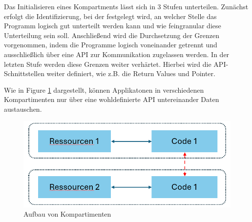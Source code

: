 Das Initialisieren eines Kompartments lässt sich in 3 Stufen unterteilen. Zunächst erfolgt die Identifizierung, bei der festgelegt wird, an welcher Stelle das Programm logisch gut unterteilt werden kann und wie feingranular diese Unterteilung sein soll.
Anschließend wird die Durchsetzung der Grenzen vorgenommen, indem die Programme logisch voneinander getrennt und ausschließlich über eine API zur Kommunikation zugelassen werden. 
In der letzten Stufe werden diese Grenzen weiter verhärtet. Hierbei wird die API-Schnittstellen weiter definiert, wie z.B. die Return Values und Pointer.

Wie in Figure \ref{fig:Kompartment} dargestellt, können Applikatonen in verschiedenen Kompartimenten nur über eine wohldefinierte API untereinander Daten austauschen.

\begin{figure}[h]
    \centering
    \includegraphics[width=0.8\linewidth]{Grafiken/Kompartiment.png}
    \caption{Aufbau von Kompartimenten}
    \label{fig:Kompartment}
\end{figure}

